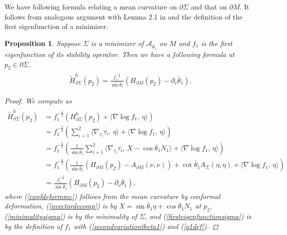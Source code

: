 \documentclass[11pt,letterpaper]{amsart}
\newtheorem{prop}{Proposition}[section]
\begin{document}
We have following formula relating a mean curvature on $\partial \Sigma$ and that on $\partial M$. It follows from analogous argument with Lemma 2.1 in \cite{CW1} and the definition of the first eigenfunction of a minimizer.
\begin{prop} Suppose $\Sigma$ is a minimizer of $\mathcal{A}_{\bar{\theta}_{1}}$ on $M$ and $f_{1}$ is the first eigenfunction of its stability operator. Then we have a following formula at $p_{2} \in \partial \Sigma$.
\begin{align} \label{bdcurvature1steigen}
\tilde{H}_{\partial \Sigma}^{\tilde{h}}(p_{2}) = \frac{f_{1}^{-\frac{1}{2}}}{\sin \bar{\theta}_{1}} \left( H_{\partial M}(p_{2}) - \partial_{\nu} \bar{\theta}_{1} \right).
\end{align}
\begin{proof}
    We compute as
    \begin{align}
    \tilde{H}_{\partial \Sigma}^{\tilde{h}}(p_{2}) &= f_{1}^{-\frac{1}{2}}(H_{\partial \Sigma}^{h}(p_{2}) + \langle \nabla \log f_{1}, \, \eta\rangle) \label{confdeformmc} \\ \nonumber &= f_{1}^{-\frac{1}{2}}\left(\sum_{i=1}^{2} \langle \nabla_{\tau_{i}} \tau_{i}, \, \eta \rangle + \langle \nabla \log f_{1}, \, \eta\rangle\right) \\ \label{nvectordecomp}
    &= f_{1}^{-\frac{1}{2}}\left(\frac{1}{\sin \bar{\theta}_{1}}\sum_{i=1}^{2} \langle \nabla_{\tau_{i}} \tau_{i}, \,   X - \cos \bar{\theta}_{1} N_{1}  \rangle + \langle \nabla \log f_{1}, \, \eta\rangle\right) \\ \label{minimalitysigma}
    &= f_{1}^{-\frac{1}{2}}\left(\frac{1}{\sin \bar{\theta}_{1}} (H_{\partial M}(p_{2}) - A_{\partial M}(\nu,\nu)) + \cot \bar{\theta}_{1} A_{\Sigma}(\eta,\eta)+ \langle \nabla \log f_{1}, \, \eta\rangle\right)  \\ \label{firsteigenfunctionsigma} &= \frac{f_{1}^{-\frac{1}{2}}}{\sin \bar{\theta}_{1}} \left( H_{\partial M}(p_{2}) - \partial_{\nu} \bar{\theta}_{1} \right),
    \end{align}
    where (\ref{confdeformmc}) follows from the mean curvature by conformal deformation, (\ref{nvectordecomp}) is by $X = \sin \bar{\theta}_{1} \eta + \cos \bar{\theta}_{1} N_{1}$ at $p_{2}$, (\ref{minimalitysigma}) is by the minimality of $\Sigma$, and (\ref{firsteigenfunctionsigma}) is by the definition of $f_{1}$ with (\ref{secondvariationtheta1}) and (\ref{q1def}).  
\end{proof}
\end{prop}
\end{document}
